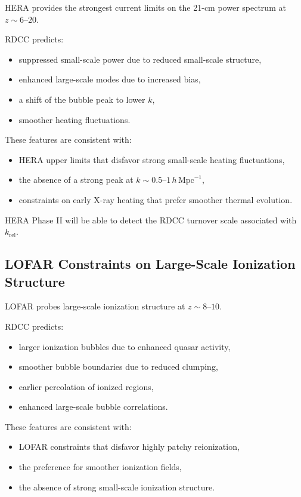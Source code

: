 \documentclass[11pt,a4paper]{article}
\begin{document}
HERA provides the strongest current limits on the 21-cm power spectrum at $z \sim 6$–$20$.

RDCC predicts:
\begin{itemize}
\item suppressed small-scale power due to reduced small-scale structure,
\item enhanced large-scale modes due to increased bias,
\item a shift of the bubble peak to lower $k$,
\item smoother heating fluctuations.
\end{itemize}

These features are consistent with:
\begin{itemize}
\item HERA upper limits that disfavor strong small-scale heating fluctuations,
\item the absence of a strong peak at $k \sim 0.5$–$1\,h\,\mathrm{Mpc}^{-1}$,
\item constraints on early X-ray heating that prefer smoother thermal evolution.
\end{itemize}

HERA Phase II will be able to detect the RDCC turnover scale associated with
$k_{\mathrm{rel}}$.

\subsection{LOFAR Constraints on Large-Scale Ionization Structure}

LOFAR probes large-scale ionization structure at $z \sim 8$–$10$.

RDCC predicts:
\begin{itemize}
\item larger ionization bubbles due to enhanced quasar activity,
\item smoother bubble boundaries due to reduced clumping,
\item earlier percolation of ionized regions,
\item enhanced large-scale bubble correlations.
\end{itemize}

These features are consistent with:
\begin{itemize}
\item LOFAR constraints that disfavor highly patchy reionization,
\item the preference for smoother ionization fields,
\item the absence of strong small-scale ionization structure.
\end{itemize}
\end{document}
